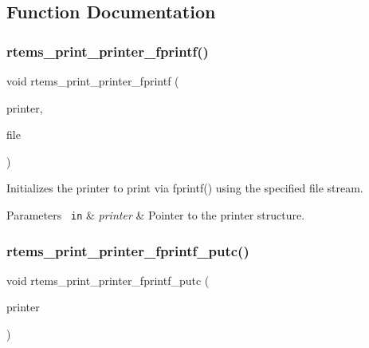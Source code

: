 \subsection{Function Documentation}
\mbox{\label{group__RTEMSPrintSupport_ga1495ba5b6aea0cd31f5b98f5c28d3beb}} 
\subsubsection{\texorpdfstring{rtems\_print\_printer\_fprintf()}{rtems\_print\_printer\_fprintf()}}
{\footnotesize\ttfamily void rtems\+\_\+print\+\_\+printer\+\_\+fprintf (\begin{DoxyParamCaption}\item[{\mbox{\hyperlink{structrtems__printer}{rtems\+\_\+printer}} $\ast$}]{printer,  }\item[{F\+I\+LE $\ast$}]{file }\end{DoxyParamCaption})}



Initializes the printer to print via fprintf() using the specified file stream. 


\begin{DoxyParams}[1]{Parameters}
\mbox{\texttt{ in}}  & {\em printer} & Pointer to the printer structure. \\
\hline
\end{DoxyParams}
\mbox{\label{group__RTEMSPrintSupport_ga527e5e5b91e40e2fc44a13be10484105}} 
\subsubsection{\texorpdfstring{rtems\_print\_printer\_fprintf\_putc()}{rtems\_print\_printer\_fprintf\_putc()}}
{\footnotesize\ttfamily void rtems\+\_\+print\+\_\+printer\+\_\+fprintf\+\_\+putc (\begin{DoxyParamCaption}\item[{\mbox{\hyperlink{structrtems__printer}{rtems\+\_\+printer}} $\ast$}]{printer }\end{DoxyParamCaption})}



